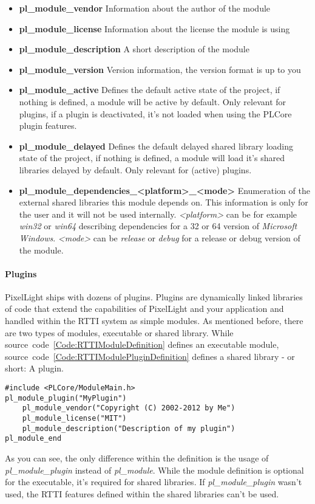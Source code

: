 \begin{itemize}
\item \textbf{pl\_module\_vendor} Information about the author of the module
\item \textbf{pl\_module\_license} Information about the license the module is using
\item \textbf{pl\_module\_description} A short description of the module
\item \textbf{pl\_module\_version} Version information, the version format is up to you
\item \textbf{pl\_module\_active} Defines the default active state of the project, if nothing is defined, a module will be active by default. Only relevant for plugins, if a plugin is deactivated, it's not loaded when using the PLCore plugin features.
\item \textbf{pl\_module\_delayed} Defines the default delayed shared library loading state of the project, if nothing is defined, a module will load it's shared libraries delayed by default. Only relevant for (active) plugins.
\item \textbf{pl\_module\_dependencies\_\textless platform\textgreater\_\textless mode\textgreater} Enumeration of the external shared libraries this module depends on. This information is only for the user and it will not be used internally. \emph{\textless platform\textgreater} can be for example \emph{win32} or \emph{win64} describing dependencies for a \SI{32}{\bit} or \SI{64}{\bit} version of \emph{Microsoft Windows}. \emph{\textless mode\textgreater} can be \emph{release} or \emph{debug} for a release or debug version of the module.
\end{itemize}


\paragraph{Plugins}
PixelLight ships with dozens of plugins. Plugins are dynamically linked libraries of code that extend the capabilities of PixelLight and your application and handled within the \ac{RTTI} system as simple modules. As mentioned before, there are two types of modules, executable or shared library. While source~code~\ref{Code:RTTIModuleDefinition} defines an executable module, source~code~\ref{Code:RTTIModulePluginDefinition} defines a shared library - or short: A plugin.
\begin{lstlisting}[float=htb,label=Code:RTTIModulePluginDefinition,caption={Defining a new \ac{RTTI} module plugin}]
#include <PLCore/ModuleMain.h>
pl_module_plugin("MyPlugin")
	pl_module_vendor("Copyright (C) 2002-2012 by Me")
	pl_module_license("MIT")
	pl_module_description("Description of my plugin")
pl_module_end
\end{lstlisting}
As you can see, the only difference within the definition is the usage of \emph{pl\_module\_plugin} instead of \emph{pl\_module}. While the module definition is optional for the executable, it's required for shared libraries. If \emph{pl\_module\_plugin} wasn't used, the \ac{RTTI} features defined within the shared libraries can't be used.

